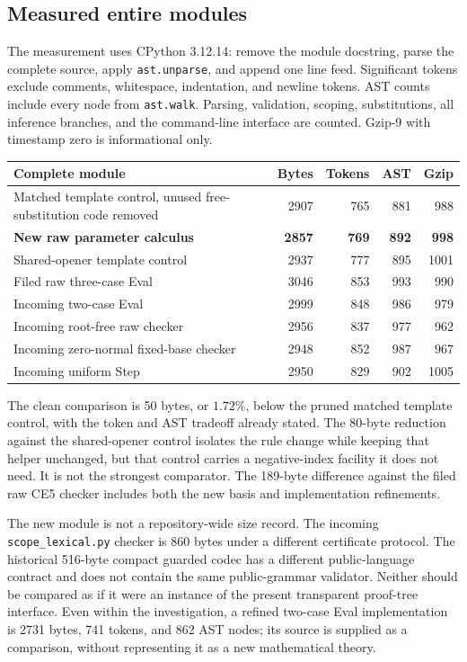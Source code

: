 \documentclass[11pt,letterpaper]{article}
\begin{document}
\subsection{Measured entire modules}

The measurement uses CPython 3.12.14: remove the module docstring, parse
the complete source, apply \texttt{ast.unparse}, and append one line feed.
Significant tokens exclude comments, whitespace, indentation, and newline
tokens. AST counts include every node from \texttt{ast.walk}. Parsing,
validation, scoping, substitutions, all inference branches, and the
command-line interface are counted. Gzip-9 with timestamp zero is
informational only.

\begin{center}
\small
\begin{tabularx}{\linewidth}{Xrrrr}
\toprule
Complete module & Bytes & Tokens & AST & Gzip\\
\midrule
Matched template control, unused free-substitution code removed
 & 2907 & 765 & 881 & 988\\
\textbf{New raw parameter calculus}
 & \textbf{2857} & \textbf{769} & \textbf{892} & \textbf{998}\\
Shared-opener template control & 2937 & 777 & 895 & 1001\\
Filed raw three-case Eval & 3046 & 853 & 993 & 990\\
Incoming two-case Eval & 2999 & 848 & 986 & 979\\
Incoming root-free raw checker & 2956 & 837 & 977 & 962\\
Incoming zero-normal fixed-base checker & 2948 & 852 & 987 & 967\\
Incoming uniform Step & 2950 & 829 & 902 & 1005\\
\bottomrule
\end{tabularx}
\end{center}

The clean comparison is 50 bytes, or $1.72\%$, below the pruned matched
template control, with the token and AST tradeoff already stated.
The 80-byte reduction against the shared-opener control isolates the
rule change while keeping that helper unchanged, but that control carries
a negative-index facility it does not need. It is not the strongest
comparator. The 189-byte difference against the filed raw CE5 checker
includes both the new basis and implementation refinements.

The new module is not a repository-wide size record. The incoming
\texttt{scope\_lexical.py} checker is 860 bytes under a different
certificate protocol. The historical 516-byte compact guarded codec
has a different public-language contract and does not contain the same
public-grammar validator. Neither should be compared as if it were
an instance of the present transparent proof-tree interface. Even within
the investigation, a refined two-case Eval implementation is 2731 bytes,
741 tokens, and 862 AST nodes; its source is supplied as a comparison,
without representing it as a new mathematical theory.
\end{document}
